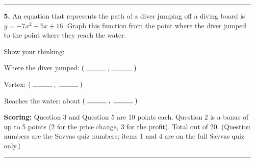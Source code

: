 \documentclass[11pt]{article}
\begin{document}
\vspace{10pt}\noindent\rule{\textwidth}{0.4pt}

\vspace{6pt}
\begin{minipage}[t]{0.48\textwidth}
\textbf{5.} An equation that represents the path of a diver jumping off a diving board is $y=-7x^2+5x+16$. Graph this function from the point where the diver jumped to the point where they reach the water.

\vspace{8pt}
Show your thinking:

\vspace{4pt}
Where the diver jumped: $(\;\rule{1cm}{0.4pt}\;,\;\rule{1cm}{0.4pt}\;)$

\vspace{8pt}
Vertex: $(\;\rule{1cm}{0.4pt}\;,\;\rule{1cm}{0.4pt}\;)$

\vspace{8pt}
Reaches the water: about $(\;\rule{1cm}{0.4pt}\;,\;\rule{1cm}{0.4pt}\;)$
\end{minipage}\hfill
\begin{minipage}[t]{0.48\textwidth}
\vspace{-4pt}
\end{minipage}

\vfill
\noindent\textbf{Scoring:} Question 3 and Question 5 are 10 points each. Question 2 is a bonus of up to 5 points (2 for the price change, 3 for the profit). Total out of 20. (Question numbers are the Savvas quiz numbers; items 1 and 4 are on the full Savvas quiz only.)

\newpage
{}

\vspace{4pt}\noindent\rule{\textwidth}{0.6pt}
\end{document}

